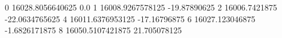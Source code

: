 0 16028.8056640625 0.0
1 16008.9267578125 -19.87890625
2 16006.7421875 -22.0634765625
4 16011.6376953125 -17.16796875
6 16027.123046875 -1.6826171875
8 16050.5107421875 21.705078125
